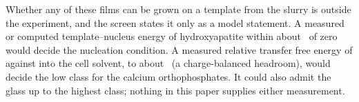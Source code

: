 Whether any of these films can be grown on a template from the slurry is outside the experiment, and the screen states it only as a model statement. %
A measured or computed template--nucleus energy of hydroxyapatite within about \NumNucDecideWithin\ of zero would decide the nucleation condition. %
A measured relative transfer free energy of  against  into the cell solvent, to about \NumPrecTransferCaKj\ (a charge-balanced headroom), would decide the low class for the calcium orthophosphates. %
It could also admit the  glass up to the highest class; nothing in this paper supplies either measurement. %
